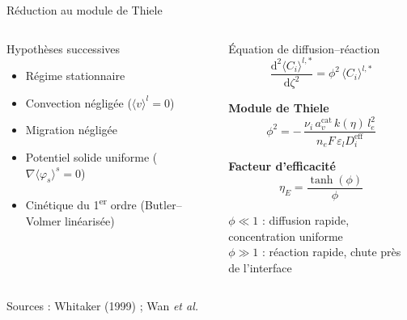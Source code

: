 
\begin{frame}[t]{Réduction au module de Thiele}
  \vspace{-0.5em}

  \begin{columns}[T,onlytextwidth]

      \begin{pcbanner}{Hypothèses successives}
        \begin{itemize}\footnotesize
          \item Régime stationnaire
          \item Convection négligée ($\langle v\rangle^l = 0$)
          \item Migration négligée
          \item Potentiel solide uniforme ($\nabla\langle\varphi_s\rangle^s = 0$)
          \item Cinétique du 1\textsuperscript{er} ordre (Butler--Volmer linéarisée)
        \end{itemize}
      \end{pcbanner}

      \vspace{-0.5em}
      \begin{pcbanner}{Équation de diffusion--réaction}
        \centering\scriptsize
        \[ \frac{\mathrm{d}^2 \langle C_i\rangle^{l,*}}{\mathrm{d}\zeta^2}
           = \phi^2\, \langle C_i\rangle^{l,*} \]

        \textbf{Module de Thiele}
        \[ \phi^2 = -\,\frac{\nu_i\, a_v^{\mathrm{cat}}\, k(\eta)\, l_e^2}
                          {n_e F\, \varepsilon_l D_i^{\mathrm{eff}}} \]

        \textbf{Facteur d'efficacité}
        \[ \eta_E = \frac{\tanh(\phi)}{\phi} \]

        \vspace{0.2em}
        {\raggedright $\phi \ll 1$ : diffusion rapide, concentration uniforme\\
        $\phi \gg 1$ : réaction rapide, chute près de l'interface\par}
      \end{pcbanner}

  \end{columns}
  {\tiny\color{pcNavy!60} Sources : Whitaker (1999) ; Wan \textit{et al.}}
\end{frame}

